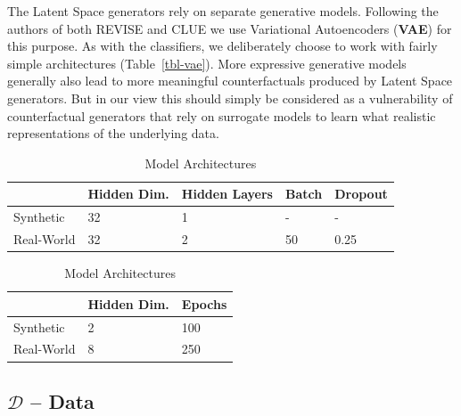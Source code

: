 \documentclass[
  conference]{IEEEtran}
\begin{document}
The Latent Space generators rely on separate generative models.
Following the authors of both REVISE and CLUE we use Variational
Autoencoders (\textbf{VAE}) for this purpose. As with the classifiers,
we deliberately choose to work with fairly simple architectures
(Table~\ref{tbl-vae}). More expressive generative models generally also
lead to more meaningful counterfactuals produced by Latent Space
generators. But in our view this should simply be considered as a
vulnerability of counterfactual generators that rely on surrogate models
to learn what realistic representations of the underlying data.

\begin{table}

\caption{\label{tbl-panel}Model
Architectures}\begin{minipage}[t]{\linewidth}

{\centering 

\begin{tabular}[t]{lllll}
\toprule
 & Hidden Dim. & Hidden Layers & Batch & Dropout\\
\midrule
Synthetic & 32 & 1 & - & -\\
Real-World & 32 & 2 & 50 & 0.25\\
\bottomrule
\end{tabular}

}

\end{minipage}%
\newline
\begin{minipage}[t]{\linewidth}

{\centering 

\begin{tabular}[t]{lll}
\toprule
 & Hidden Dim. & Epochs\\
\midrule
Synthetic & 2 & 100\\
Real-World & 8 & 250\\
\bottomrule
\end{tabular}

}

\end{minipage}%

\end{table}

\hypertarget{sec-empirical-data}{%
\subsection{\texorpdfstring{\(\mathcal{D}\) --
Data}{\textbackslash mathcal\{D\} -- Data}}\label{sec-empirical-data}}
\end{document}
